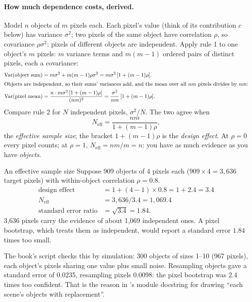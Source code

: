 \paragraph{How much dependence costs, derived.} Model $n$ objects of $m$ pixels each. Each pixel's value (think of its
contribution $c$ below) has variance $\sigma^2$; two pixels of the same object have correlation $\rho$, so covariance
$\rho\sigma^2$; pixels of different objects are independent. Apply rule 1 to one object's $m$ pixels: $m$ variance
terms and $m(m-1)$ ordered pairs of distinct pixels, each a covariance:
\begin{align*}
\mathrm{Var}(\text{object sum}) &= m\sigma^2 + m(m-1)\rho\sigma^2 = m\sigma^2\,[1 + (m-1)\rho].\\
\intertext{Objects are independent, so their sums' variances add, and the mean over all $nm$ pixels divides by $nm$:}
\mathrm{Var}(\text{pixel mean}) &= \frac{n \cdot m\sigma^2\,[1 + (m-1)\rho]}{(nm)^2}
  = \frac{\sigma^2}{nm}\,[1 + (m-1)\rho].
\end{align*}
Compare rule 2 for $N$ independent pixels, $\sigma^2/N$. The two agree when
\begin{equation}\label{eq:bootstrap:neff}
N_{\text{eff}} = \frac{nm}{1 + (m-1)\rho},
\end{equation}
the \emph{effective sample size}; the bracket $1 + (m-1)\rho$ is the \emph{design effect}.
At $\rho = 0$ every pixel counts; at $\rho = 1$, $N_{\text{eff}} = nm/m = n$: you have as much evidence as you have
\emph{objects}.

\begin{worked}[label={we:bootstrap:neff}]{An effective sample size}
Suppose\tagA{} 909 objects of 4 pixels each ($909 \times 4 = 3{,}636$ target pixels) with within-object correlation
$\rho = 0.8$.
\begin{align*}
\text{design effect} &= 1 + (4 - 1) \times 0.8 = 1 + 2.4 = 3.4\\
N_{\text{eff}} &= 3{,}636 / 3.4 = 1{,}069.4\\
\text{standard error ratio} &= \sqrt{3.4} = 1.84.
\end{align*}
3,636 pixels carry the evidence of about 1,069 independent ones. A pixel bootstrap, which treats them as independent,
would report a standard error $1.84$ times too small.
\end{worked}

The book's script checks this by simulation\tagA{}: 300 objects of sizes 1--10 (967 pixels), each object's pixels
sharing one value plus small noise. Resampling objects gave a standard error of 0.0235, resampling pixels 0.0098: the
pixel bootstrap was 2.4 times too confident\tagC{}. That is the reason in 's module docstring for
drawing ``each scene's objects with replacement''.

